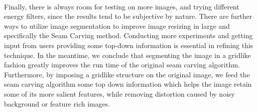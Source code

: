 \documentclass[conference]{acmsiggraph}
\begin{document}
\paragraph{}
Finally, there is always room for testing on more images, and trying different energy filters, since the results tend to be subjective by nature. There are further ways to utilize image segmentation to improve image resizing in large and specifically the Seam Carving method.  Conducting more experiments and getting input from users providing some top-down information is essential in refining this technique.  In the meantime, we conclude that segmenting the image in a gridlike fashion greatly improves the run time of the original seam carving algorithm.  Furthermore, by imposing a gridlike structure on the original image, we feed the seam carving algorithm some top down information which helps the image retain some of its more salient features, while removing distortion caused by noisy background or feature rich images.  



\end{document}

